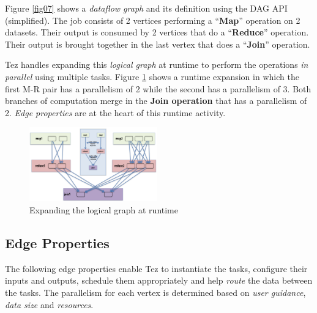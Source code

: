 \documentclass[twocolumn]{article}
\begin{document}
Figure \ref{fig07} shows a \emph{dataflow graph} and its definition using the
DAG API (simplified). The job consists of 2 vertices performing a
``\textbf{Map}'' operation on 2 datasets. Their output is consumed by 2
vertices that do a ``\textbf{Reduce}'' operation. Their output is
brought together in the last vertex that does a ``\textbf{Join}''
operation.

Tez handles expanding this \emph{logical graph} at runtime to perform
the operations \emph{in parallel} using multiple tasks. Figure \ref{fig08}
shows a runtime expansion in which the first M-R pair has a parallelism
of 2 while the second has a parallelism of 3. Both branches of
computation merge in the \textbf{Join operation} that has a parallelism
of 2. \emph{Edge properties} are at the heart of this runtime activity.

\begin{figure}[htb]
        \centering
        \includegraphics[width=0.49\textwidth]{tez21}
        \caption{Expanding the logical graph at runtime}
        \label{fig08}
\end{figure}

\subsection{Edge Properties}
The following edge properties enable Tez to instantiate the tasks,
configure their inputs and outputs, schedule them appropriately and help
\emph{route} the data between the tasks. The parallelism for each vertex
is determined based on \emph{user guidance}, \emph{data size} and
\emph{resources}.
\end{document}
